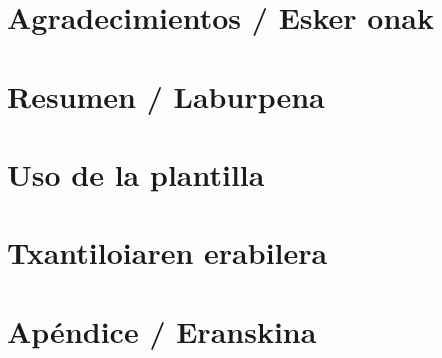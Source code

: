 \documentclass[a4paper, 11pt]{memoir}
\title{\titulo}
\author{\alumno}
\date{\fecha}
\begin{document}
	


\cleardoublepage
\frontmatter


\chapter*{Agradecimientos / Esker onak}

\cleardoublepage


\chapter*{Resumen / Laburpena}

\cleardoublepage


\tableofcontents
\clearpage
\listoffigures
\clearpage
\listoftables
\clearpage
{\let\newpage\relax\listofalgorithms} %
\clearpage
{\let\newpage\relax\printglossary[title=\glossarylabel]} %
\clearpage
{\let\newpage\relax\printglossary[title=\acronymslabel,type=\acronymtype]} %
\clearpage



\cleardoublepage
\mainmatter
\pagestyle{ruled}

\chapter{Uso de la plantilla} \label{ch:plantilla}

\cleardoublepage

\chapter{Txantiloiaren erabilera} \label{ch:txantiloia}

\cleardoublepage


\backmatter
\appendix

\chapter{Apéndice / Eranskina} \label{ch:apendice}





\end{document}
